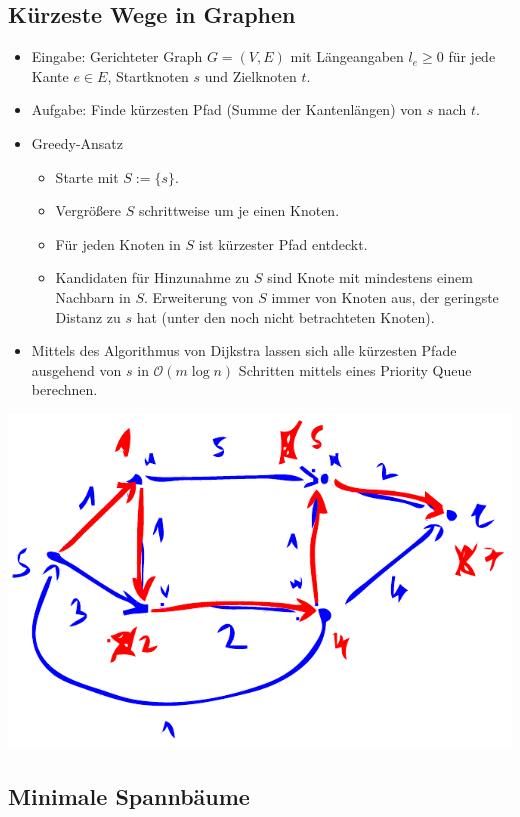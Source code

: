 \documentclass{scrartcl}
\begin{document}
\subsection{Kürzeste Wege in Graphen}

\begin{itemize}
	\item Eingabe: Gerichteter Graph $ G = (V,E) $ mit Längeangaben $ l_e \geq 0 $ für jede Kante $ e \in E $, Startknoten $ s $ und Zielknoten $ t $.
	\item Aufgabe: Finde kürzesten Pfad (Summe der Kantenlängen) von $ s $ nach $ t $.
	\item Greedy-Ansatz
	\begin{itemize}
		\item Starte mit $ S := \{ s \} $.
		\item Vergrößere $ S $ schrittweise um je einen Knoten.
		\item Für jeden Knoten in $ S $ ist kürzester Pfad entdeckt.
		\item Kandidaten für Hinzunahme zu $ S $ sind Knote mit mindestens einem Nachbarn in $ S $. Erweiterung von $ S $ immer von Knoten aus, der geringste Distanz zu $ s $ hat (unter den noch nicht betrachteten Knoten).
	\end{itemize}
	\item Mittels des Algorithmus von Dijkstra lassen sich alle kürzesten Pfade ausgehend von $ s $ in $ \mathcal{O}(m \log n) $ Schritten mittels eines Priority Queue berechnen.
\end{itemize}

\includegraphics[width=\textwidth]{figures/kuerzeste-wege.pdf}

\subsection{Minimale Spannbäume}
\end{document}

